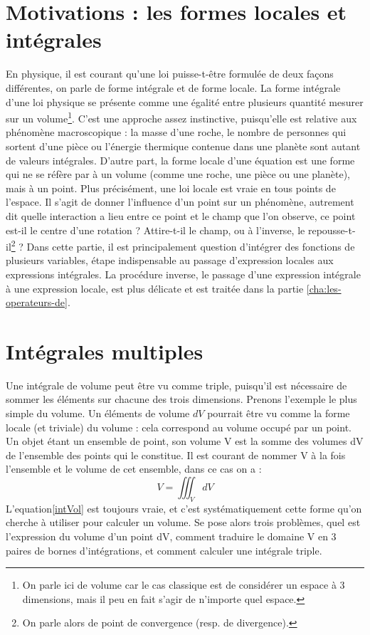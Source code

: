 \section{Motivations : les formes locales et intégrales}
En physique, il est courant qu'une loi puisse-t-être formulée de deux façons différentes, on parle de forme intégrale et de forme locale. La forme intégrale d'une loi physique se présente comme une égalité entre plusieurs quantité mesurer sur un volume\footnote{On parle ici de volume car le cas classique est de considérer un espace à 3 dimensions, mais il peu en fait s'agir de n'importe quel espace.}. C'est une approche assez instinctive, puisqu'elle est relative aux phénomène macroscopique : la masse d'une roche, le nombre de personnes qui sortent d'une pièce ou l'énergie thermique contenue dans une planète sont autant de valeurs intégrales. D'autre part, la forme locale d'une équation est une forme qui ne se réfère par à un volume (comme une roche, une pièce ou une planète), mais à un point. Plus précisément, une loi locale est vraie en tous points de l'espace. Il s'agit de donner l'influence d'un point sur un phénomène, autrement dit quelle interaction a lieu entre ce point et le champ que l'on observe, ce point est-il le centre d'une rotation ? Attire-t-il le champ, ou à l'inverse, le repousse-t-il\footnote{On parle alors de point de convergence (resp. de divergence).} ? 
Dans cette partie, il est principalement question d'intégrer des fonctions de plusieurs variables, étape indispensable au passage d'expression locales aux expressions intégrales. La procédure inverse, le passage d'une expression intégrale à une expression locale, est plus délicate et est traitée dans la partie \ref{cha:les-operateurs-de}.

\section{Intégrales multiples}
Une intégrale de volume peut être vu comme triple, puisqu'il est nécessaire de sommer les éléments sur chacune des trois dimensions. Prenons l'exemple le plus simple du volume. Un éléments de volume $dV$ pourrait être vu comme la forme locale (et triviale) du volume : cela correspond au volume occupé par un point. Un objet étant un ensemble de point, son volume V est la somme des volumes dV de l'ensemble des points qui le constitue. Il est courant de nommer V à la fois l'ensemble et le volume de cet ensemble, dans ce cas on a :
\begin{equation}
    \label{intVol}
    V = \iiint_{V} dV
\end{equation}
L'equation\eqref{intVol} est toujours vraie, et c'est systématiquement cette forme qu'on cherche à utiliser pour calculer un volume. Se pose alors trois problèmes, quel est l'expression du volume d'un point dV, comment traduire le domaine V en 3 paires de bornes d'intégrations, et comment calculer une intégrale triple. 
